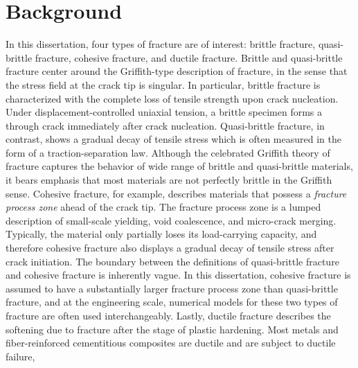\section{Background}

In this dissertation, four types of fracture are of interest: brittle fracture, quasi-brittle fracture, cohesive fracture, and ductile fracture. Brittle and quasi-brittle fracture center around the Griffith-type description of fracture, in the sense that the stress field at the crack tip is singular. In particular, brittle fracture is characterized with the complete loss of tensile strength upon crack nucleation. Under displacement-controlled uniaxial tension, a brittle specimen forms a through crack immediately after crack nucleation. Quasi-brittle fracture, in contrast, shows a gradual decay of tensile stress which is often measured in the form of a traction-separation law. Although the celebrated Griffith theory of fracture captures the behavior of wide range of brittle and quasi-brittle materials, it bears emphasis that most materials are not perfectly brittle in the Griffith sense. Cohesive fracture, for example, describes materials that possess a \emph{fracture process zone} ahead of the crack tip. The fracture process zone is a lumped description of small-scale yielding, void coalescence, and micro-crack merging. Typically, the material only partially loses its load-carrying capacity, and therefore cohesive fracture also displays a gradual decay of tensile stress after crack initiation. The boundary between the definitions of quasi-brittle fracture and cohesive fracture is inherently vague. In this dissertation, cohesive fracture is assumed to have a substantially larger fracture process zone than quasi-brittle fracture, and at the engineering scale, numerical models for these two types of fracture are often used interchangeably. Lastly, ductile fracture describes the softening due to fracture after the stage of plastic hardening. Most metals and fiber-reinforced cementitious composites are ductile and are subject to ductile failure,

